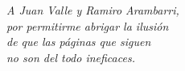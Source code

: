 \thispagestyle{empty}

  \vspace*{.15\paperheight}
  
  \begin{flushright}
    
    \emph{A Juan Valle y Ramiro Arambarri,\\
         por permitirme abrigar la ilusión\\
         de que las páginas que siguen\\
         no son del todo ineficaces.}

  \end{flushright}

  
  



